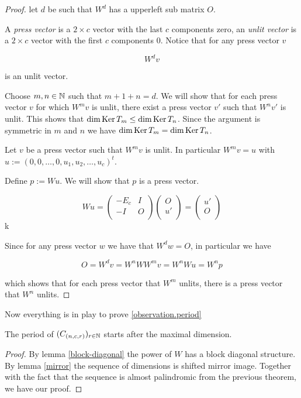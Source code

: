 \begin{proof}
  let $d$ be such that $W^d$ has a upperleft sub matrix $O$.

  A \emph{press vector} is a $2\times c$ vector with the last $c$ components zero, an \emph{unlit vector} is a $2\times c$ vector with the first $c$ components 0. Notice that for any press vector $v$

  \[
    W^d v
  \]

  is an unlit vector.

  Choose $m,n\in\mathbb{N}$ such that $m + 1 + n = d$. We will show that for each press vector $v$ for which $W^m v$ is unlit, there exist a press vector $v'$ such that $W^n v'$ is unlit.
  This shows that $\dim\operatorname{Ker} T_{m} \leq \dim\operatorname{Ker} T_{n}$. Since the argument is symmetric in $m$ and $n$ we have $\dim\operatorname{Ker} T_{m} = \dim\operatorname{Ker} T_{n}$.

  Let $v$ be a press vector such that $W^{m} v$ is unlit. In particular $W^{m} v = u$ with $u := (0,0,\ldots, 0, u_{1}, u_{2}, \ldots, u_{c})^t$.

  Define $p := W u$. We will show that $p$ is a press vector.

  \[
    W u = \left(
    \begin{array}{cc}
      -E_{c} & I \\
      -I    & O \\
    \end{array}
    \right)
    \left(
    \begin{array}{c}
      O  \\
      u' \\
    \end{array}
    \right)
    =
    \left(
    \begin{array}{c}
      u' \\
      O  \\
    \end{array}
    \right)
  \]k

  Since for any press vector $w$ we have that $W^{d} w = O$, in particular we have

  \[
  O = W^{d} v = W^{n} W W^{m} v = W^{n} W u = W^{n} p
  \]

  which shows that for each press vector that $W^{m}$ unlits, there is a press vector that $W^{n}$ unlits.
\end{proof}

Now everything is in play to prove \ref{observation.period}

\begin{theorem}
  The period of $(C_{(n, c, r)})_{r\in\mathbb{N}}$ starts after the maximal dimension.
\end{theorem}

\begin{proof}
By lemma \ref{block-diagonal} the power of $W$ has a block diagonal structure. By lemma \ref{mirror} the sequence of dimensions
is shifted mirror image. Together with the fact that the sequence is almost palindromic from the previous theorem, we have our proof.
\end{proof}
